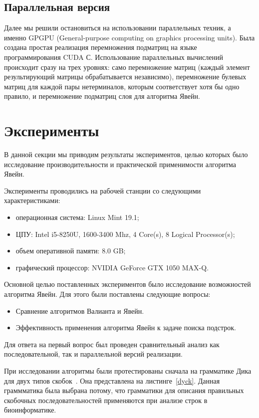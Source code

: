 \documentclass[14pt]{matmex-diploma-custom}
\begin{document}
\subsection{Параллельная версия}

Далее мы решили остановиться на использовании параллельных техник, а именно GPGPU (General-purpose computing on graphics processing units). Была создана простая реализация перемножения подматриц на языке программирования CUDA С. Использование параллельных вычислений происходит сразу на трех уровнях: само перемножение матриц (каждый элемент результирующий матрицы обрабатывается независимо), перемножение булевых матриц для каждой пары нетерминалов, которым соответствует хотя бы одно правило, и перемножение подматриц слоя для алгоритма Явейн. 


\section{Эксперименты}

В данной секции мы приводим результаты экспериментов, целью которых было исследование производительности и практической применимости алгоритма Явейн.

Эксперименты проводились на рабочей станции со следующими характеристиками:
\begin{itemize}
    \item операционная система: Linux Mint 19.1;
    \item ЦПУ: Intel i5-8250U, 1600-3400 Mhz, 4 Core(s), 8 Logical Processor(s);
    \item объем оперативной памяти: 8.0 GB;
    \item графический процессор: NVIDIA GeForce GTX 1050 MAX-Q.
\end{itemize}

Основной целью поставленных экспериментов было исследование возможностей алгоритма Явейн.
Для этого были поставлены следующие вопросы:

\begin{itemize}
    \item Сравнение алгоритмов Валианта и Явейн.
    \item Эффективность применения алгоритма Явейн к задаче поиска подстрок.
\end{itemize}

Для ответа на первый вопрос был проведен сравнительный анализ как последовательной, так и параллельной версий реализации. 

При исследовании алгоритмы были протестированы сначала на грамматике Дика для двух типов скобок~\cite{hopcroft1969formal}. Она представлена на листинге~\ref{dyck}. Данная граммматика была выбрана потому, что грамматики для описания правильных скобочных последовательностей применяются при анализе строк в биоинформатике. 
\end{document}
